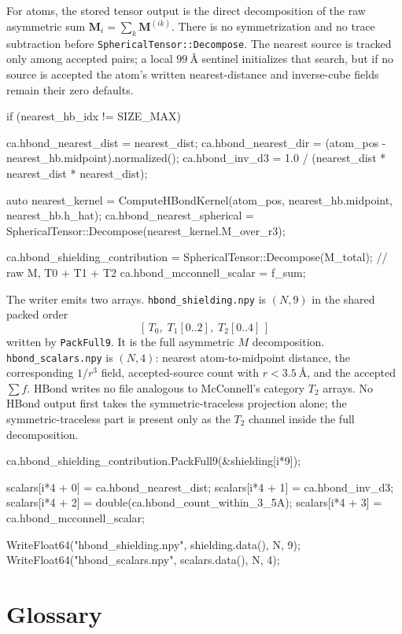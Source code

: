 \documentclass[11pt]{article}
\newcommand{\code}[1]{\texttt{#1}}
\begin{document}
For atoms, the stored tensor output is the direct decomposition of the raw
asymmetric sum \(\bm M_i=\sum_k \bm M^{(ik)}\). There is no symmetrization and
no trace subtraction before \code{SphericalTensor::Decompose}. The nearest
source is tracked only among accepted pairs; a local \(\SI{99}{\angstrom}\)
sentinel initializes that search, but if no source is accepted the atom's
written nearest-distance and inverse-cube fields remain their zero defaults.

\begin{codebox}
if (nearest_hb_idx != SIZE_MAX) {
    ca.hbond_nearest_dist = nearest_dist;
    ca.hbond_nearest_dir =
        (atom_pos - nearest_hb.midpoint).normalized();
    ca.hbond_inv_d3 = 1.0 / (nearest_dist * nearest_dist * nearest_dist);

    auto nearest_kernel =
        ComputeHBondKernel(atom_pos, nearest_hb.midpoint, nearest_hb.h_hat);
    ca.hbond_nearest_spherical =
        SphericalTensor::Decompose(nearest_kernel.M_over_r3);
}

ca.hbond_shielding_contribution =
    SphericalTensor::Decompose(M_total);   // raw M, T0 + T1 + T2
ca.hbond_mcconnell_scalar = f_sum;
\end{codebox}

The writer emits two arrays. \code{hbond\_shielding.npy} is \((N,9)\) in the
shared packed order
\[
  [\,T_0,\;T_1[0..2],\;T_2[0..4]\,]
\]
written by \code{PackFull9}. It is the full asymmetric \(M\) decomposition.
\code{hbond\_scalars.npy} is \((N,4)\): nearest atom-to-midpoint distance, the
corresponding \(1/r^3\) field, accepted-source count with
\(r<\SI{3.5}{\angstrom}\), and the accepted \(\sum f\). HBond writes
no file analogous to McConnell's category \(T_2\) arrays. No HBond output first
takes the symmetric-traceless projection alone; the symmetric-traceless part is
present only as the \(T_2\) channel inside the full decomposition.

\begin{codebox}
ca.hbond_shielding_contribution.PackFull9(&shielding[i*9]);

scalars[i*4 + 0] = ca.hbond_nearest_dist;
scalars[i*4 + 1] = ca.hbond_inv_d3;
scalars[i*4 + 2] = double(ca.hbond_count_within_3_5A);
scalars[i*4 + 3] = ca.hbond_mcconnell_scalar;

WriteFloat64("hbond_shielding.npy", shielding.data(), N, 9);
WriteFloat64("hbond_scalars.npy", scalars.data(), N, 4);
\end{codebox}

\section{Glossary}
\end{document}
